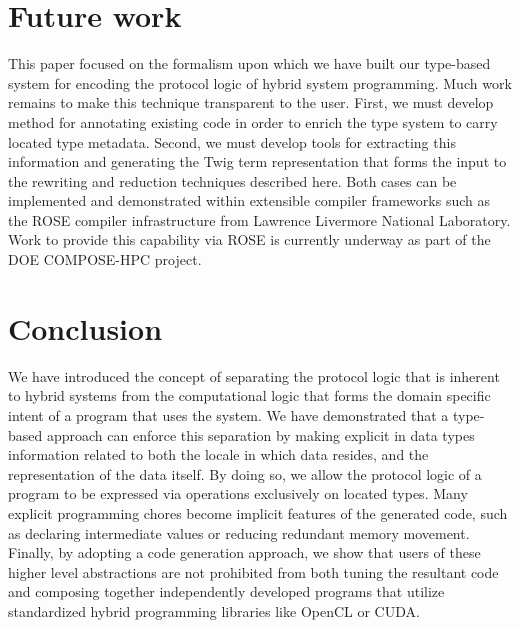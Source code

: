 
\section{Future work}

This paper focused on the formalism upon which we have built our type-based system for encoding the protocol logic of hybrid system programming. Much work remains to make this technique transparent to the user. First, we must develop method for annotating existing code in order to enrich the type system to carry located type metadata. Second, we must develop tools for extracting this information and generating the Twig term representation that forms the input to the rewriting and reduction techniques described here. Both cases can be implemented and demonstrated within extensible compiler frameworks such as the ROSE compiler infrastructure from Lawrence Livermore National Laboratory. Work to provide this capability via ROSE is currently underway as part of the DOE COMPOSE-HPC project.


\section{Conclusion}

We have introduced the concept of separating the protocol logic that is inherent to hybrid systems from the computational logic that forms the domain specific intent of a program that uses the system. We have demonstrated that a type-based approach can enforce this separation by making explicit in data types information related to both the locale in which data resides, and the representation of the data itself. By doing so, we allow the protocol logic of a program to be expressed via operations exclusively on located types. Many explicit programming chores become implicit features of the generated code, such as declaring intermediate values or reducing redundant memory movement. Finally, by adopting a code generation approach, we show that users of these higher level abstractions are not prohibited from both tuning the resultant code and composing together independently developed programs that utilize standardized hybrid programming libraries like OpenCL or CUDA.
